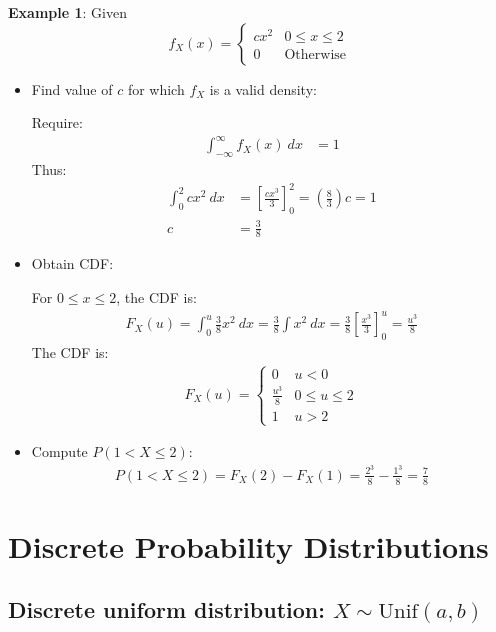 \documentclass[10pt,a4paper]{article}
\begin{document}
\textbf{Example 1}: Given 
$$f_X(x)=\begin{cases}
    cx^2 & 0\leq x\leq 2 \\
    0 & \text{Otherwise} 
\end{cases}$$
\begin{itemize}
    \item Find value of $c$ for which $f_X$ is a valid density:
    
    Require:
    \begin{align*}
        \int_{-\infty}^{\infty} f_X(x)\: dx &= 1 
    \end{align*}
    Thus:
    \begin{align*}
        \int_0^2 cx^2 \: dx &= \left[\frac{cx^3}{3}\right]_0^2 = \left(\frac{8}{3}\right)c = 1 \\
        c &= \frac{3}{8}
    \end{align*}
    \item Obtain CDF:
    
    For $0\leq x \leq 2$, the CDF is:
    \begin{align*}
        F_X(u)=\int_0^u \frac{3}{8}x^2 \: dx = \frac{3}{8} \int x^2 \: dx = \frac{3}{8}\left[\frac{x^3}{3}\right]_0^u = \frac{u^3}{8}
    \end{align*}
    The CDF is:
    \begin{align*}
        F_X(u) = \begin{cases}
            0 & u<0 \\
            \frac{u^3}{8} & 0\leq u \leq 2 \\
            1 & u>2
        \end{cases}
    \end{align*}
    \item Compute $P(1< X \leq 2)$:
    \begin{align*}
        P(1<X\leq 2) = F_X(2)-F_X(1) = \frac{2^3}{8}-\frac{1^3}{8} = \frac{7}{8}
    \end{align*}
\end{itemize} 

\section{Discrete Probability Distributions}
\subsection{Discrete uniform distribution: $X \sim \text{Unif}(a,b)$}
\end{document}
